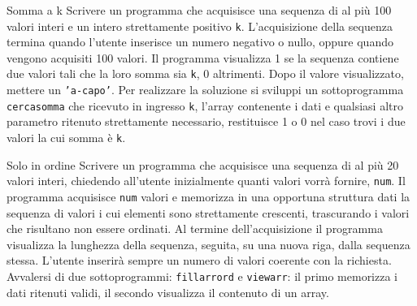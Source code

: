 \begin{labex}{Somma a k}
Scrivere un programma che acquisisce una sequenza di al pi\`u 100 valori interi e un intero strettamente positivo \texttt{k}. L'acquisizione della sequenza termina quando l'utente inserisce un numero negativo o nullo, oppure quando vengono acquisiti 100 valori. Il programma visualizza 1 se la sequenza contiene due valori tali che la loro somma sia \texttt{k}, 0 altrimenti. Dopo il valore visualizzato, mettere un \texttt{'a-capo'}.
Per realizzare la soluzione si sviluppi un sottoprogramma \texttt{cercasomma} che ricevuto in ingresso \texttt{k}, l'array contenente i dati e qualsiasi altro parametro ritenuto strettamente necessario, restituisce 1 o 0 nel caso trovi i due valori la cui somma \`e \texttt{k}.

\begin{labexinout}
\end{labexinout}

\begin{labexcases}


\end{labexcases}


\end{labex}

\begin{labex}{Solo in ordine}
Scrivere un programma che acquisisce una sequenza di al pi\`u 20 valori interi, chiedendo all'utente inizialmente quanti valori vorr\`a fornire, \texttt{num}. 
Il programma acquisisce \texttt{num} valori e memorizza in una opportuna struttura dati la sequenza di valori i cui elementi sono strettamente crescenti, trascurando i valori che risultano non essere ordinati. Al termine dell'acquisizione il programma visualizza la lunghezza della sequenza, seguita, su una nuova riga, dalla sequenza stessa.
L'utente inserir\`a sempre un numero di valori coerente con la richiesta.
Avvalersi di due sottoprogrammi: \texttt{fillarrord} e \texttt{viewarr}: il primo memorizza i dati ritenuti validi, il secondo visualizza il contenuto di un array.

\begin{labexinout}
\end{labexinout}

\begin{labexcases}



\end{labexcases}


\end{labex}


